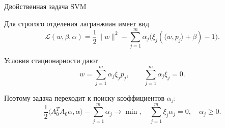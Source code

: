 \SPBGContentSlide
  {Двойственная задача SVM}
  {%
    \FormulaBody
    Для строгого отделения лагранжиан имеет вид
    \[
      \mathcal{L}(w,\beta,\alpha)=
      \frac12\|w\|^2-
      \sum_{j=1}^{m}\alpha_j
      \bigl(\xi_j(\langle w,p_j\rangle+\beta)-1\bigr).
    \]

    Условия стационарности дают
    \[
      w=\sum_{j=1}^{m}\alpha_j\xi_jp_j,
      \qquad
      \sum_{j=1}^{m}\alpha_j\xi_j=0.
    \]

    Поэтому задача переходит к поиску коэффициентов \(\alpha_j\):
    \[
      \frac12\langle A_0^TA_0\alpha,\alpha\rangle-\sum_{j=1}^{m}\alpha_j
      \to\min,\quad
      \sum_{j=1}^{m}\xi_j\alpha_j=0,\quad \alpha_j\ge0.
    \]
  }

